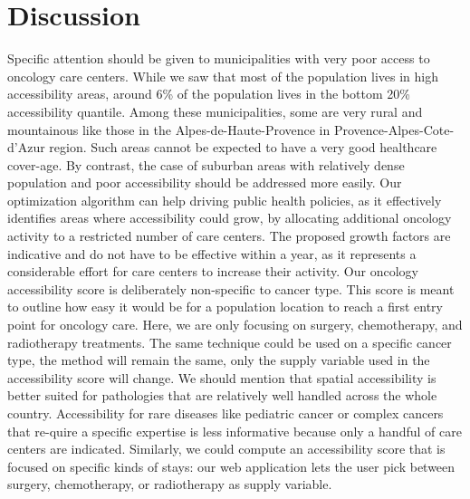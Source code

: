 \section{Discussion}

Specific attention should be given to municipalities with very poor access to oncology care centers. While we saw that most of the population lives in high accessibility areas, around 6\% of the population lives in the bottom 20\% accessibility quantile. Among these municipalities, some are very rural and mountainous like those in the Alpes-de-Haute-Provence in Provence-Alpes-Cote-d'Azur region. Such areas cannot be expected to have a very good healthcare cover-age. By contrast, the case of suburban areas with relatively dense population and poor accessibility should be addressed more easily. Our optimization algorithm can help driving public health policies, as it effectively identifies areas where accessibility could grow, by allocating additional oncology activity to a restricted number of care centers. The proposed growth factors are indicative and do not have to be effective within a year, as it represents a considerable effort for care centers to increase their activity.
Our oncology accessibility score is deliberately non-specific to cancer type. This score is meant to outline how easy it would be for a population location to reach a first entry point for oncology care. Here, we are only focusing on surgery, chemotherapy, and radiotherapy treatments. The same technique could be used on a specific cancer type, the method will remain the same, only the supply variable used in the accessibility score will change. We should mention that spatial accessibility is better suited for pathologies that are relatively well handled across the whole country. Accessibility for rare diseases like pediatric cancer or complex cancers that re-quire a specific expertise is less informative because only a handful of care centers are indicated.
Similarly, we could compute an accessibility score that is focused on specific kinds of stays: our web application lets the user pick between surgery, chemotherapy, or radiotherapy as supply variable.
